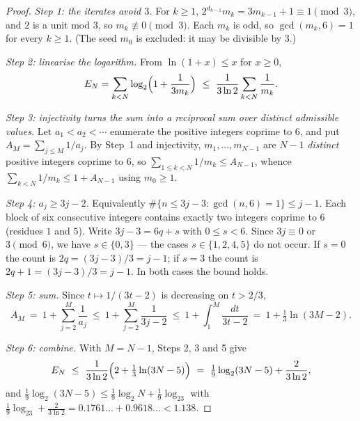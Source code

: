 \documentclass[11pt]{article}
\theoremstyle{plain}
\theoremstyle{definition}
\theoremstyle{remark}
\begin{document}
\begin{proof}
\emph{Step 1: the iterates avoid $3$.} For $k\ge1$, $2^{d_{k-1}}m_k=3m_{k-1}+1\equiv1\pmod 3$, and
$2$ is a unit mod $3$, so $m_k\not\equiv0\pmod3$. Each $m_k$ is odd, so $\gcd(m_k,6)=1$ for every
$k\ge1$. (The seed $m_0$ is excluded: it may be divisible by $3$.)

\emph{Step 2: linearise the logarithm.} From $\ln(1+x)\le x$ for $x\ge0$,
\[
E_N=\sum_{k<N}\log_2\Bigl(1+\frac{1}{3m_k}\Bigr)\ \le\ \frac{1}{3\ln2}\sum_{k<N}\frac{1}{m_k}.
\]

\emph{Step 3: injectivity turns the sum into a reciprocal sum over distinct admissible values.}
Let $a_1<a_2<\cdots$ enumerate the positive integers coprime to $6$, and put
$A_M=\sum_{j\le M}1/a_j$. By Step~1 and injectivity, $m_1,\dots,m_{N-1}$ are $N-1$ \emph{distinct}
positive integers coprime to $6$, so
$\sum_{1\le k<N}1/m_k\le A_{N-1}$, whence $\sum_{k<N}1/m_k\le 1+A_{N-1}$ using $m_0\ge1$.

\emph{Step 4: $a_j\ge3j-2$.} Equivalently $\#\{n\le3j-3:\gcd(n,6)=1\}\le j-1$. Each block of six
consecutive integers contains exactly two integers coprime to $6$ (residues $1$ and $5$). Write
$3j-3=6q+s$ with $0\le s<6$. Since $3j\equiv0$ or $3\pmod 6$, we have $s\in\{0,3\}$ --- the cases
$s\in\{1,2,4,5\}$ do not occur. If $s=0$ the count is $2q=(3j-3)/3=j-1$; if $s=3$ the count is
$2q+1=(3j-3)/3=j-1$. In both cases the bound holds.

\emph{Step 5: sum.} Since $t\mapsto1/(3t-2)$ is decreasing on $t>2/3$,
\[
A_M\ =\ 1+\sum_{j=2}^{M}\frac1{a_j}\ \le\ 1+\sum_{j=2}^{M}\frac1{3j-2}
\ \le\ 1+\int_1^M\frac{dt}{3t-2}\ =\ 1+\tfrac13\ln(3M-2).
\]

\emph{Step 6: combine.} With $M=N-1$, Steps 2, 3 and 5 give
\[
E_N\ \le\ \frac{1}{3\ln2}\Bigl(2+\tfrac13\ln(3N-5)\Bigr)
\ =\ \tfrac19\log_2(3N-5)+\frac{2}{3\ln2},
\]
and $\tfrac19\log_2(3N-5)\le\tfrac19\log_2 N+\tfrac19\log_23$ with
$\tfrac19\log_23+\tfrac{2}{3\ln2}=0.1761\ldots+0.9618\ldots<1.138$.
\end{proof}
\end{document}
